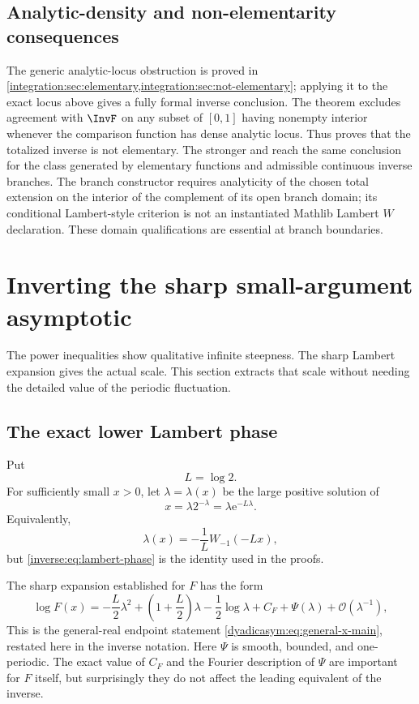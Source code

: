\documentclass[11pt,oneside]{article}
\theoremstyle{definition}
\theoremstyle{remark}
\newcommand{\e}{\mathrm e}
\newcommand{\bigO}{\mathcal O}
\begin{document}
\subsection{Analytic-density and non-elementarity consequences}

The generic analytic-locus obstruction is proved in
\cref{integration:sec:elementary,integration:sec:not-elementary}; applying it to the exact
locus above gives a fully formal inverse conclusion.  The theorem
 excludes agreement with \(\InvF\) on any
subset of \([0,1]\) having nonempty interior whenever the comparison function has dense
analytic locus.  Thus  proves that the totalized inverse
is not elementary.  The stronger
 and
 reach the same conclusion for the class generated
by elementary functions and admissible continuous inverse branches.  The branch constructor
requires analyticity of the chosen total extension on the interior of the complement of its
open branch domain; its conditional Lambert-style criterion is not an instantiated Mathlib
Lambert \(W\) declaration.  These domain qualifications are essential at branch boundaries.

\section{Inverting the sharp small-argument asymptotic}
\label{inverse:sec:inverse-asymptotic}

The power inequalities show qualitative infinite steepness.  The sharp
Lambert expansion gives the actual scale.  This section extracts that
scale without needing the detailed value of the periodic fluctuation.

\subsection{The exact lower Lambert phase}

Put
\[
 L=\log2.
\]
For sufficiently small $x>0$, let $\lambda=\lambda(x)$ be the large
positive solution of
\begin{equation}
 x=\lambda2^{-\lambda}
   =\lambda\e^{-L\lambda}. \label{inverse:eq:lambert-phase}
\end{equation}
Equivalently,
\[
 \lambda(x)=-\frac1L W_{-1}(-Lx),
\]
but \eqref{inverse:eq:lambert-phase} is the identity used in the proofs.

The sharp expansion established for $F$ has the form
\begin{equation}
 \log F(x)
 =-\frac L2\lambda^2+
   \left(1+\frac L2\right)\lambda
   -\frac12\log\lambda
 +C_F+\Psi(\lambda)
   +\bigO(\lambda^{-1}), \label{inverse:eq:sharp-input}
\end{equation}
This is the general-real endpoint statement
\eqref{dyadicasym:eq:general-x-main}, restated here in the inverse notation.
Here $\Psi$ is smooth, bounded, and one-periodic.  The exact value of
$C_F$ and the Fourier description of $\Psi$ are important for $F$ itself,
but surprisingly they do not affect the leading equivalent of the
inverse.
\end{document}
